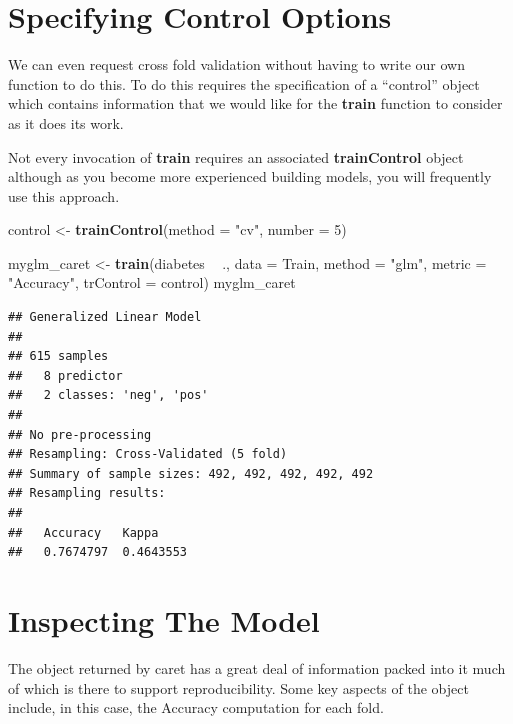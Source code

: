 \documentclass[]{book}
\newenvironment{Shaded}{\begin{snugshade}}{\end{snugshade}}
\newcommand{\KeywordTok}[1]{\textcolor[rgb]{0.13,0.29,0.53}{\textbf{#1}}}
\newcommand{\DataTypeTok}[1]{\textcolor[rgb]{0.13,0.29,0.53}{#1}}
\newcommand{\DecValTok}[1]{\textcolor[rgb]{0.00,0.00,0.81}{#1}}
\newcommand{\StringTok}[1]{\textcolor[rgb]{0.31,0.60,0.02}{#1}}
\newcommand{\OperatorTok}[1]{\textcolor[rgb]{0.81,0.36,0.00}{\textbf{#1}}}
\newcommand{\NormalTok}[1]{#1}
\begin{document}
\section{Specifying Control Options}\label{specifying-control-options}

We can even request cross fold validation without having to write our
own function to do this. To do this requires the specification of a
``control'' object which contains information that we would like for the
\textbf{train} function to consider as it does its work.

Not every invocation of \textbf{train} requires an associated
\textbf{trainControl} object although as you become more experienced
building models, you will frequently use this approach.

\begin{Shaded}
\begin{Highlighting}[]
\NormalTok{control <-}\StringTok{ }\KeywordTok{trainControl}\NormalTok{(}\DataTypeTok{method =} \StringTok{"cv"}\NormalTok{, }\DataTypeTok{number =} \DecValTok{5}\NormalTok{)}

\NormalTok{myglm_caret <-}\StringTok{ }\KeywordTok{train}\NormalTok{(diabetes }\OperatorTok{~}\StringTok{ }\NormalTok{.,}
                     \DataTypeTok{data =}\NormalTok{ Train,}
                     \DataTypeTok{method =} \StringTok{"glm"}\NormalTok{,}
                     \DataTypeTok{metric =} \StringTok{"Accuracy"}\NormalTok{,}
                     \DataTypeTok{trControl =}\NormalTok{ control)}
\NormalTok{myglm_caret}
\end{Highlighting}
\end{Shaded}

\begin{verbatim}
## Generalized Linear Model 
## 
## 615 samples
##   8 predictor
##   2 classes: 'neg', 'pos' 
## 
## No pre-processing
## Resampling: Cross-Validated (5 fold) 
## Summary of sample sizes: 492, 492, 492, 492, 492 
## Resampling results:
## 
##   Accuracy   Kappa    
##   0.7674797  0.4643553
\end{verbatim}

\section{Inspecting The Model}\label{inspecting-the-model}

The object returned by caret has a great deal of information packed into
it much of which is there to support reproducibility. Some key aspects
of the object include, in this case, the Accuracy computation for each
fold.
\end{document}
